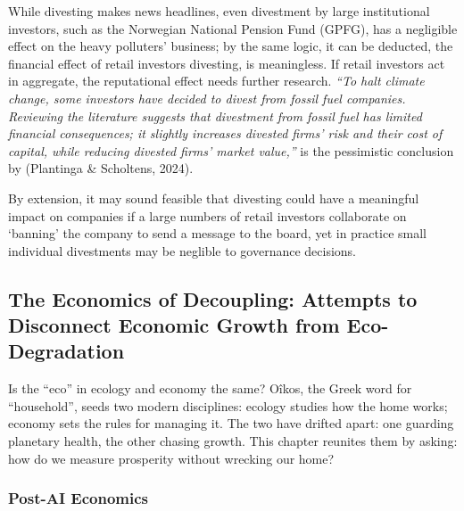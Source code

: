 \documentclass[
  12pt,
  letterpaper,
  DIV=11,
  numbers=noendperiod]{scrartcl}
\begin{document}
While divesting makes news headlines, even divestment by large
institutional investors, such as the Norwegian National Pension Fund
(GPFG), has a negligible effect on the heavy polluters' business; by the
same logic, it can be deducted, the financial effect of retail investors
divesting, is meaningless. If retail investors act in aggregate, the
reputational effect needs further research. \emph{``To halt climate
change, some investors have decided to divest from fossil fuel
companies. Reviewing the literature suggests that divestment from fossil
fuel has limited financial consequences; it slightly increases divested
firms' risk and their cost of capital, while reducing divested firms'
market value,''} is the pessimistic conclusion by (Plantinga \&
Scholtens, 2024).

By extension, it may sound feasible that divesting could have a
meaningful impact on companies if a large numbers of retail investors
collaborate on `banning' the company to send a message to the board, yet
in practice small individual divestments may be neglible to governance
decisions.

\subsection{The Economics of Decoupling: Attempts to Disconnect Economic
Growth from
Eco-Degradation}\label{the-economics-of-decoupling-attempts-to-disconnect-economic-growth-from-eco-degradation}

Is the ``eco'' in ecology and economy the same? Oîkos, the Greek word
for ``household'', seeds two modern disciplines: ecology studies how the
home works; economy sets the rules for managing it. The two have drifted
apart: one guarding planetary health, the other chasing growth. This
chapter reunites them by asking: how do we measure prosperity without
wrecking our home?

\subsubsection{Post-AI Economics}\label{post-ai-economics}
\end{document}
